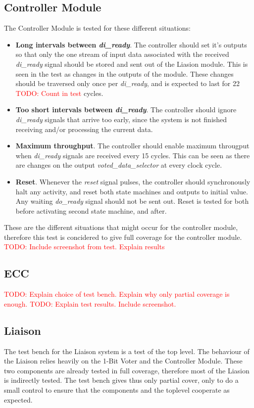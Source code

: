 \documentclass[a4paper]{IEEEtran}
\newcommand\TODO[1]{\textcolor{red}{TODO:#1}}
\newcommand\todo[1]{\TODO{#1}}
\begin{document}
\subsection{ Controller Module}
The Controller Module is tested for these different situations:
\begin{itemize}
    \item \textbf{Long intervals between \textit{di\_ready}}. 
    The controller should set it's outputs so that only the one stream of input data associated with the received \textit{di\_ready} signal should be stored and sent out of the Liasion module.
    This is seen in the test as changes in the outputs of the module.
    These changes should be traversed only once per \textit{di\_ready}, and is expected to last for 22 \todo{ Count in test} cycles.
    \item \textbf{Too short intervals between \textit{di\_ready}}.
    The controller should ignore \textit{di\_ready} signals that arrive too early, since the system is not finished receiving and/or processing the current data.
    \item \textbf{Maximum throughput}.
    The controller should enable maximum througput when \textit{di\_ready} signals are received every 15 cycles.
    This can be seen as there are changes on the output \textit{voted\_data\_selector} at every clock cycle.
    \item \textbf{Reset}.
    Whenever the \textit{reset} signal pulses, the controller should synchronously halt any activity, and reset both state machines and outputs to initial value.
    Any waiting \textit{do\_ready} signal should not be sent out.
    Reset is tested for both before activating second state machine, and after. 
\end{itemize}
These are the different situations that might occur for the controller module, therefore this test is concidered to give full coverage for the controller module.
\todo{ Include screenshot from test. Explain results}

\subsection{ ECC }
\todo{ Explain choice of test bench. Explain why only partial coverage is enough. }
\break
\break
\todo{ Explain test results. Include screenshot. }

\subsection{ Liaison }
The test bench for the Liaison system is a test of the top level.
The behaviour of the Liaison relies heavily on the 1-Bit Voter and the Controller Module.
These two components are already tested in full coverage, therefore most of the Liasion is indirectly tested.
The test bench gives thus only partial cover, only to do a small control to ensure that the components and the toplevel cooperate as expected.
\end{document}

